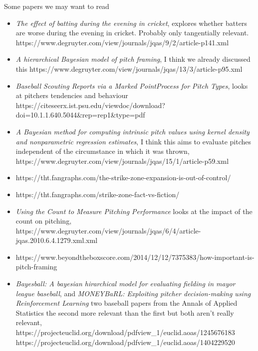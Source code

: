 \documentclass[letterpaper,12pt]{article}
\begin{document}


Some papers we may want to read 
\begin{itemize}
    \item \textit{The effect of batting during the evening in cricket}, explores whether batters are worse during the evening in cricket. Probably only tangentially relevant. https://www.degruyter.com/view/journals/jqas/9/2/article-p141.xml
    \item \textit{A hierarchical Bayesian model of pitch framing}, I think we already discussed this https://www.degruyter.com/view/journals/jqas/13/3/article-p95.xml
    \item \textit{Baseball Scouting Reports via a Marked PointProcess for Pitch Types}, looks at pitchers tendencies and behaviour\\
     https://citeseerx.ist.psu.edu/viewdoc/download?doi=10.1.1.640.5044\&rep=rep1\&type=pdf
    \item \textit{A Bayesian method for computing intrinsic pitch values using kernel density and nonparametric regression estimates}, I think this aims to evaluate pitches independent of the circumstance in which it was thrown, \\
    https://www.degruyter.com/view/journals/jqas/15/1/article-p59.xml
    \item https://tht.fangraphs.com/the-strike-zone-expansion-is-out-of-control/
    \item https://tht.fangraphs.com/strike-zone-fact-vs-fiction/
    \item \textit{Using the Count to Measure Pitching Performance} looks at the impact of the count on pitching,\\
    https://www.degruyter.com/view/journals/jqas/6/4/article-jqas.2010.6.4.1279.xml.xml
    \item https://www.beyondtheboxscore.com/2014/12/12/7375383/how-important-is-pitch-framing
    \item \textit{Bayesball: A bayesian hirarchical model for evaluating fielding in mayor league baseball}, and \textit{MONEYBaRL: Exploiting pitcher decision-making using Reinforcement Learning} two baseball papers from the Annals of Applied Statistics the second more relevant than the first but both aren't really relevant, \\
    https://projecteuclid.org/download/pdfview\_1/euclid.aoas/1245676183\\
    https://projecteuclid.org/download/pdfview\_1/euclid.aoas/1404229520
\end{itemize}
\end{document}
